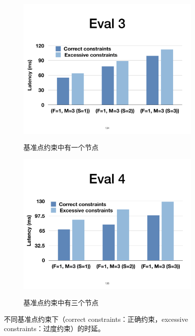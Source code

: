 \begin{figure}[!htbp]
\centering

  \begin{subfigure}[b]{0.65\linewidth}
      \includegraphics[width=\linewidth]{figures/ss-eval3.pdf}
      \label{fig:eval3}
      \caption{基准点约束中有一个节点}
  \end{subfigure}

  \vspace{0.5cm}
  \begin{subfigure}[b]{0.65\linewidth}
      \includegraphics[width=\linewidth]{figures/ss-eval4.pdf}
      \label{fig:eval4}
      \caption{基准点约束中有三个节点}
  \end{subfigure}

\caption{不同基准点约束下（correct constraints：正确约束，excessive constraints：过度约束）的时延。}
\label{fig:eval34}
\end{figure}


